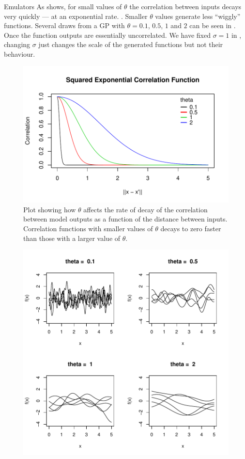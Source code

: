 \begin{chapter}{Emulators \label{Ch:Emulators}}
As  shows, for small values of $\theta$ the correlation between inputs decays very quickly --- at an exponential rate. . Smaller $\theta$ values generate less ``wiggly'' functions. Several draws from a GP with $\theta = 0.1$, $0.5$, $1$ and $2$ can be seen in . Once  the function outputs are essentially uncorrelated. We have fixed $\sigma = 1$ in , changing $\sigma$ just changes the scale of the generated functions but not their behaviour.
\begin{figure}[h]
  \centering
  \includegraphics[width=\textwidth]{fig-emulators/squexp.pdf}
  \caption{Plot showing how $\theta$ affects the rate of decay of the correlation between model outputs as a function of the distance between inputs. Correlation functions with smaller values of $\theta$ decays to zero faster than those with a larger value of $\theta$.}
  \label{Fig:sqexp}
\end{figure}
\begin{figure}[h]
  \centering
  \includegraphics[width=\textwidth]{fig-emulators/random-func.pdf}

\end{figure}
\end{chapter}
